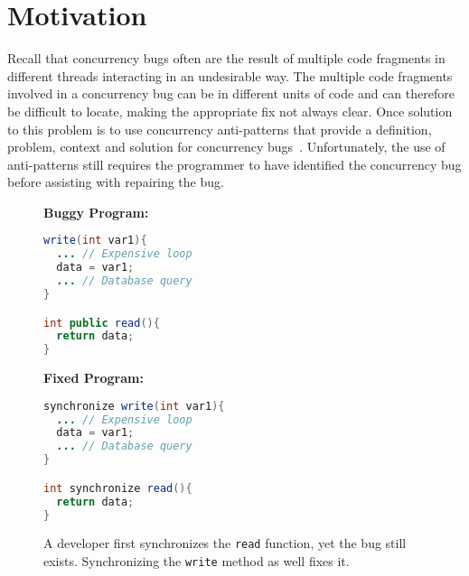 \section{Motivation}
\label{sec:motivation}

Recall that concurrency bugs often are the result of multiple code fragments in different threads interacting in an undesirable way. The multiple code fragments involved in a concurrency bug can be
in different units of code and can therefore be difficult to locate, making the appropriate fix not
always clear. Once solution to this problem is to use concurrency anti-patterns that provide a
definition, problem, context and solution for concurrency
bugs~\cite{BJ09,FKLV12}. Unfortunately, the use of anti-patterns still requires the programmer to have identified the concurrency bug before assisting with repairing the bug.

\begin{figure}[t!]
\begin{minipage}{5cm}
\footnotesize{\textbf{Buggy Program:}}
\begin{lstlisting}[language=Java, morekeywords={synchronize}]
write(int var1){
  ... // Expensive loop
  data = var1;
  ... // Database query
}

int public read(){
  return data;
}
\end{lstlisting}
\end{minipage}\hfill
\begin{minipage}{5cm}
\footnotesize{\textbf{Fixed Program:}}
\begin{lstlisting}[language=Java, morekeywords={synchronize}]
synchronize write(int var1){
  ... // Expensive loop
  data = var1;
  ... // Database query
}

int synchronize read(){
  return data;
}
\end{lstlisting}
\end{minipage}
\caption{A developer first synchronizes the \texttt{read} function, yet the bug
still exists. Synchronizing the \texttt{write} method as well fixes it.}
\label{fig:fixed_sample_datarace}
\end{figure}

